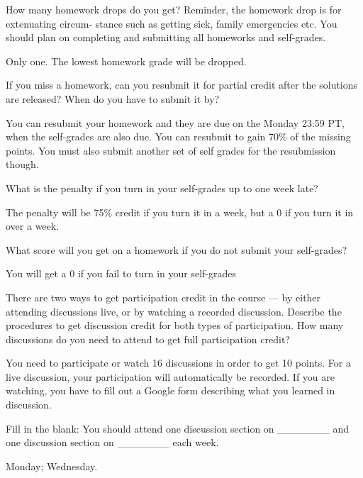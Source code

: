 \documentclass[11pt]{article}
\begin{document}
\begin{Parts}
	\Part How many homework drops do you get? Reminder, the homework drop is for extenuating circum- stance such as getting sick, family emergencies etc. You should plan on completing and submitting all homeworks and self-grades.
	\begin{Answer}
		Only one. The lowest homework grade will be dropped.
	\end{Answer}
	
	\Part If you miss a homework, can you resubmit it for partial credit after the solutions are released? When do you have to submit it by?
	\begin{Answer}
		You can resubmit your homework and they are due on the Monday 23:59 PT, when the self-grades are also due. You can resubmit to gain 70\% of the missing points. You must also submit another set of self grades for the resubmission though.
	\end{Answer}
	
	\Part What is the penalty if you turn in your self-grades up to one week late?
	\begin{Answer}
		The penalty will be 75\% credit if you turn it in a week, but a 0 if you turn it in over a week.
	\end{Answer}
	
	\Part What score will you get on a homework if you do not submit your self-grades?
	\begin{Answer}
		You will get a 0 if you fail to turn in your self-grades
	\end{Answer}
	
	\Part There are two ways to get participation credit in the course — by either attending discussions live, or by watching a recorded discussion. Describe the procedures to get discussion credit for both types of participation. How many discussions do you need to attend to get full participation credit?
	\begin{Answer}
		You need to participate or watch 16 discussions in order to get 10 points. For a live discussion, your participation will automatically be recorded. If you are watching, you have to fill out a Google form describing what you learned in discussion.
	\end{Answer}
	
	\Part Fill in the blank: You should attend one discussion section on \_\_\_\_\_\_\_ and one discussion section on \_\_\_\_\_\_\_ each week.
	\begin{Answer}
		Monday; Wednesday.
	\end{Answer}
	

\end{Parts}
\end{document}
